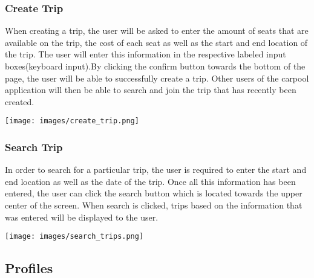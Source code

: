 \documentclass[hidelinks, 12pt, a4paper]{article}
\begin{document}
\subsubsection{Create Trip}
When creating a trip, the user will be asked to enter the amount of seats that are available on the trip, the cost of each seat as well as the start and end location of the trip. The user will enter this information in the respective labeled input boxes(keyboard input).By clicking the confirm button towards the bottom of the page, the user will be able to successfully create a trip. Other users of the carpool application will then be able to search and join the trip that has recently been created.
\begin{center}
  \texttt{[image: images/create\_trip.png]}
\end{center}
\vspace{1cm}
\subsubsection{Search Trip}
  In order to search for a particular trip, the user is required to enter the start and end location as well as the date of the trip. Once all this information has been entered, the user can click the search button which is located towards the upper center of the screen. When search is clicked, trips based on the information that was entered will be displayed to the user.
\begin{center}
  \texttt{[image: images/search\_trips.png]}
\end{center}
\vspace{1cm}

\subsection{Profiles}
\end{document}
